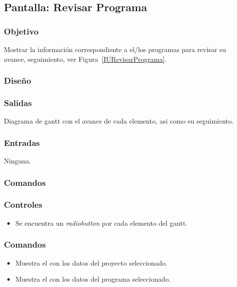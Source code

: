 \subsection{Pantalla: Revisar Programa}

\subsubsection{Objetivo}
Mostrar la información correspondiente a el/los programas para revisar su avance, seguimiento, ver Figura~\ref{IURevisarPrograma}. 

\subsubsection{Diseño}

\subsubsection{Salidas}
	Diagrama de gantt con el avance de cada elemento, asi como su seguimiento.

\subsubsection{Entradas}
Ninguna.

\subsubsection{Comandos}

\subsubsection{Controles}
\begin{itemize}
	\item Se encuentra un \textit{radiobutton} por cada elemento del gantt.
\end{itemize}

\subsubsection{Comandos}
\begin{itemize}
	\item {} Muestra el  con los datos del proyecto seleccionado.
	\item {} Muestra el  con los datos del programa seleccionado.
\end{itemize}
